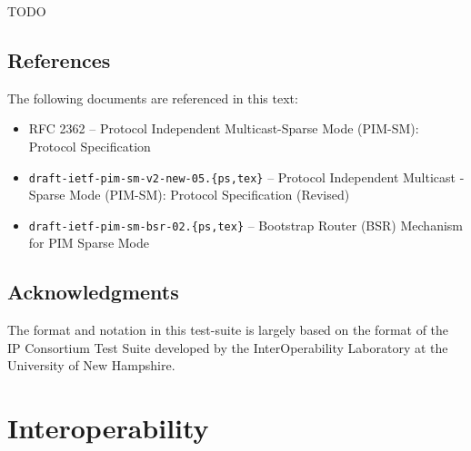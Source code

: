 \documentclass[11pt]{report}
\begin{document}
TODO

\section{References}

The following documents are referenced in this text:

\begin{itemize}

 \item RFC 2362 -- Protocol Independent Multicast-Sparse Mode (PIM-SM):
		  Protocol Specification

 \item \verb=draft-ietf-pim-sm-v2-new-05.{ps,tex}= -- Protocol Independent
		  Multicast - Sparse Mode (PIM-SM): Protocol Specification
		  (Revised)

 \item \verb=draft-ietf-pim-sm-bsr-02.{ps,tex}= -- Bootstrap Router (BSR)
		  Mechanism for PIM Sparse Mode

\end{itemize}


\section{Acknowledgments}
The format and notation in this test-suite is largely based on the format of
the IP Consortium Test Suite developed by the InterOperability Laboratory at
the University of New Hampshire.

%
%
\renewcommand{\chaptername}{Test Group}
\newcommand{\para}[1]{\vspace{1ex}\noindent{\large\bf #1}}
\newcommand{\subpara}[1]{\vspace{1ex}\noindent\emph{#1}}

\chapter{Interoperability}
\end{document}
